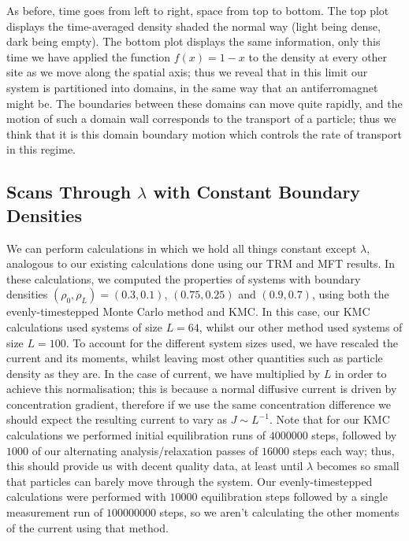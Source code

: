 As before, time goes from left to right, space from top to bottom. 
The top plot displays the time-averaged density shaded the normal way (light being dense, dark being empty).
The bottom plot displays the same information, only this time we have applied the function $f(x) = 1-x$
to the density at every other site as we move along the spatial axis; thus we reveal that in this limit
our system is partitioned into domains, in the same way that an antiferromagnet might be. The boundaries
between these domains can move quite rapidly, and the motion of such a domain wall corresponds to the
transport of a particle; thus we think that it is this domain boundary motion which controls the rate
of transport in this regime.
 
 
\subsection{Scans Through $\lambda$ with Constant Boundary Densities} \label{sec:lambdaScans}
We can perform calculations in which we hold all things constant except $\lambda$, analogous to our 
existing calculations done using our TRM and MFT results. In these calculations, we computed the properties of systems with boundary densities $(\rho_0 , \rho_L )=(0.3, 0.1)$, $(0.75, 0.25)$ and 
$(0.9, 0.7)$, using both the evenly-timestepped Monte Carlo method and KMC. In this case, our KMC calculations used systems of size $L = 64$, whilst our other method used systems of size $L=100$.
To account for the different system sizes used, we have rescaled the current and its moments, whilst
leaving most other quantities such as particle density as they are. In the case of current, we have
multiplied by $L$ in order to achieve this normalisation; this is because a normal diffusive current is
driven by concentration gradient, therefore if we use the same concentration difference we should expect 
the resulting current to vary as $J \sim L^{-1}$. Note that for our KMC calculations we performed initial
equilibration runs of $4000000$ steps, followed by $1000$ of our alternating analysis/relaxation passes
of $16000$ steps each way; thus, this should provide us with decent quality data, at least until $\lambda$
becomes so small that particles can barely move through the system. Our evenly-timestepped calculations
were performed with $10000$ equilibration steps followed by a single measurement run of $100000000$ steps,
so we aren't calculating the other moments of the current using that method.

